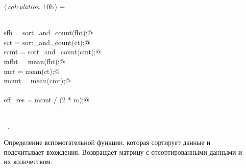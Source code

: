 \documentclass{article}
\begin{document}
\begin{flushleft} \small
\begin{minipage}{\linewidth}\label{scrap11}\raggedright\small
{} $\langle\,${\itshape calculation}\nobreak\ {\footnotesize {10b}}$\,\rangle\equiv$
\vspace{-1ex}
\begin{list}{}{} \item
\mbox{}\verb@@\\
\mbox{}\verb@    sfh = sort_and_count(fht);@\\
\mbox{}\verb@    sct = sort_and_count(ct);@\\
\mbox{}\verb@    scmt = sort_and_count(cmt);@\\
\mbox{}\verb@    mfht = mean(fht);@\\
\mbox{}\verb@    mct = mean(ct);@\\
\mbox{}\verb@    mcmt = mean(cmt);@\\
\mbox{}\verb@@\\
\mbox{}\verb@    eff_res = mcmt / (2 * m);@\\
\mbox{}\verb@end@\\
\mbox{}\verb@@{\NWsep}
\end{list}
\vspace{-1.5ex}
\footnotesize
\begin{list}{}{\setlength{\itemsep}{-\parsep}\setlength{\itemindent}{-\leftmargin}}
\item \NWtxtMacroRefIn\ .

\item{}
\end{list}
\end{minipage}\vspace{4ex}
\end{flushleft}
Определение вспомогательной функции, которая сортирует данные и подсчитывает вхождения. Возвращает матрицу с отсортированными данными и их количеством.
\end{document}
